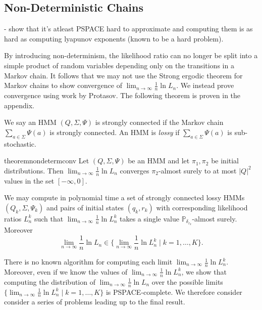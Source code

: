 \documentclass[a4paper,UKenglish,cleveref, autoref,mathscr]{lipics-v2019}
\newcommand{\PP}{\mathbb{P}}
\newcommand{\1}{\mathbbm{1}}
\newcommand{\liexp}{\lim_{n\rightarrow\infty} \frac1n \ln L_n}
\begin{document}
\subsection{Non-Deterministic Chains}

- show that it's atleast PSPACE hard to approximate and computing them is as hard as computing lyapunov exponents (known to be a hard problem).





By introducing non-determinism, the likelihood ratio can no longer be split into a simple product of random variables depending only on the transitions in a Markov chain. It follows that we may not use the Strong ergodic theorem for Markov chains to show convergence of $\liexp$. We instead prove convergence using work by Protasov. The following theorem is proven in the appendix.

We say an HMM $(Q, \Sigma, \Psi)$ is strongly connected if the Markov chain $\sum_{a \in \Sigma} \Psi(a)$ is strongly connected. An HMM is \emph{lossy} if $\sum_{a \in \Sigma} \Psi(a)$ is sub-stochastic.

\begin{restatable}{theorem}{nondetermconv}\label{nondetermconv}
Let $(Q, \Sigma, \Psi)$ be an HMM and let $\pi_1, \pi_2$ be initial distributions. Then $\liexp$ converges $\pi_2$-almost surely to at most $|Q|^2$ values in the set $[-\infty, 0]$.

We may compute in polynomial time a set of strongly connected lossy HMMs $(Q_k, \Sigma, \Psi_k)$ and pairs of initial states $(q_k, r_k)$ with corresponding likelihood ratios $L^k_n$ such that $\liexp^k$ takes a single value $\PP_{\delta_{r_k}}$-almost surely. Moreover
\begin{equation*}
\liexp \in \{\liexp^k \mid k = 1, \dots, K\}.
\end{equation*}
\end{restatable} 

There is no known algorithm for computing each limit $\liexp^k$. Moreover, even if we know the values of $\liexp^k$, we show that computing the distribution of $\liexp$ over the possible limits $\{\liexp^k \mid k = 1, \dots, K\}$ is PSPACE-complete. We therefore consider consider a series of problems leading up to the final result.
\end{document}
